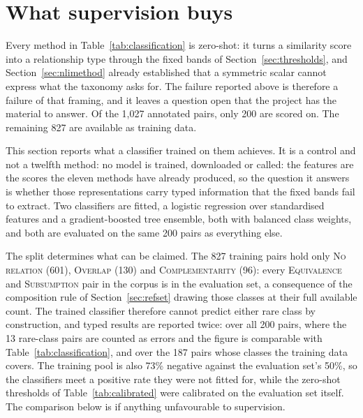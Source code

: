 \section{What supervision buys}\label{sec:supervised}

Every method in Table~\ref{tab:classification} is zero-shot: it turns a
similarity score into a relationship type through the fixed bands of
Section~\ref{sec:thresholds}, and Section~\ref{sec:nlimethod} already established
that a symmetric scalar cannot express what the taxonomy asks for. The failure
reported above is therefore a failure of that framing, and it leaves a question
open that the project has the material to answer. Of the 1{,}027 annotated pairs,
only 200 are scored on. The remaining 827 are available as training data.

This section reports what a classifier trained on them achieves. It is a control
and not a twelfth method: no model is trained, downloaded or called: the features
are the scores the eleven methods have already produced, so the question it
answers is whether those representations carry typed information that the fixed
bands fail to extract. Two classifiers are fitted, a logistic regression over
standardised features and a gradient-boosted tree ensemble, both with balanced
class weights, and both are evaluated on the same 200 pairs as everything else.

The split determines what can be claimed. The 827 training pairs hold only
\textsc{No relation} (601), \textsc{Overlap} (130) and \textsc{Complementarity}
(96): every \textsc{Equivalence} and \textsc{Subsumption} pair in the corpus is in
the evaluation set, a consequence of the composition rule of
Section~\ref{sec:refset} drawing those classes at their full available count. The
trained classifier therefore cannot predict either rare class by construction, and
typed results are reported twice: over all 200 pairs, where the 13 rare-class
pairs are counted as errors and the figure is comparable with
Table~\ref{tab:classification}, and over the 187 pairs whose classes the training
data covers. The training pool is also 73\% negative against the evaluation set's
50\%, so the classifiers meet a positive rate they were not fitted for, while the
zero-shot thresholds of Table~\ref{tab:calibrated} were calibrated on the
evaluation set itself. The comparison below is if anything unfavourable to
supervision.

